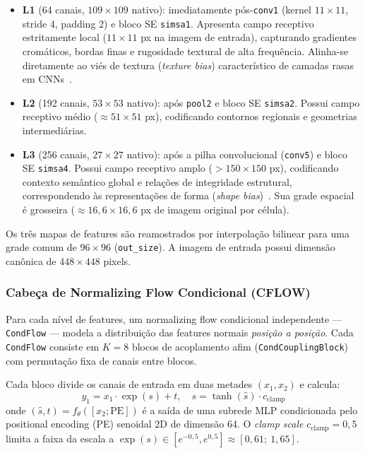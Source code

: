 \documentclass[conference]{IEEEtran}
\begin{document}
\begin{itemize}
    \item \textbf{L1} (64 canais, $109 \times 109$ nativo): imediatamente pós-\texttt{conv1} (kernel $11 \times 11$, stride 4, padding 2) e bloco SE \texttt{simsa1}. Apresenta campo receptivo estritamente local ($11 \times 11$ px na imagem de entrada), capturando gradientes cromáticos, bordas finas e rugosidade textural de alta frequência. Alinha-se diretamente ao viés de textura (\textit{texture bias}) característico de camadas rasas em CNNs~\cite{geirhos2019imagenet}.
    \item \textbf{L2} (192 canais, $53 \times 53$ nativo): após \texttt{pool2} e bloco SE \texttt{simsa2}. Possui campo receptivo médio ($\approx 51 \times 51$ px), codificando contornos regionais e geometrias intermediárias.
    \item \textbf{L3} (256 canais, $27 \times 27$ nativo): após a pilha convolucional (\texttt{conv5}) e bloco SE \texttt{simsa4}. Possui campo receptivo amplo ($> 150 \times 150$ px), codificando contexto semântico global e relações de integridade estrutural, correspondendo às representações de forma (\textit{shape bias})~\cite{geirhos2019imagenet}. Sua grade espacial é grosseira ($\approx 16{,}6 \times 16{,}6$ px de imagem original por célula).
\end{itemize}

Os três mapas de features são reamostrados por interpolação bilinear para uma grade comum de $96 \times 96$ (\texttt{out\_size}). A imagem de entrada possui dimensão canônica de $448 \times 448$ pixels.
\subsubsection{Cabeça de Normalizing Flow Condicional (CFLOW)}

Para cada nível de features, um normalizing flow condicional independente --- \texttt{CondFlow} --- modela a distribuição das features normais \textit{posição a posição}. Cada \texttt{CondFlow} consiste em $K = 8$ blocos de acoplamento afim (\texttt{CondCouplingBlock}) com permutação fixa de canais entre blocos.

Cada bloco divide os canais de entrada em duas metades $(x_1, x_2)$ e calcula:
\begin{equation}
    y_1 = x_1 \cdot \exp(s) + t, \quad s = \tanh(\hat{s}) \cdot c_{\text{clamp}}
\end{equation}
onde $(\hat{s}, t) = f_\theta([x_2; \text{PE}])$ é a saída de uma subrede MLP condicionada pelo positional encoding (PE) senoidal 2D de dimensão 64. O \textit{clamp scale} $c_{\text{clamp}} = 0{,}5$ limita a faixa da escala a $\exp(s) \in [e^{-0,5}, e^{0,5}] \approx [0{,}61;\ 1{,}65]$.
\end{document}
